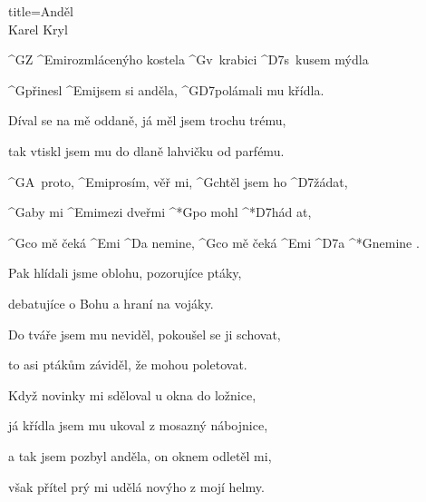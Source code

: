 \begin{song}{title=\predtitle \centering Anděl \\\large Karel Kryl   \vspace*{-0.3cm}}  %
\begin{centerjustified}
\nejnejvetsi
\sloka 
	^{G}Z ^{\z Emi}rozmlácenýho kostela ^{G\z}v~krabici ^{D7\z}s~kusem mýdla

	^{G\z}přinesl ^{Emi}jsem si anděla, ^{G\z D7}polámali mu křídla.

	Díval se na mě oddaně, já měl jsem trochu trému,

	tak vtiskl jsem mu do dlaně lahvičku od parfému.

	^{G\z}A~proto, ^{Emi\z }prosím, věř mi, ^{G\z}chtěl jsem ho ^{D7\z}žádat,
	
	^{G}aby mi ^{Emi\z }mezi dveřmi ^*{G}po mohl ^*{D7}hád at,

	^{G}co mě čeká ^{Emi} ^{D}a nemine, ^{G}co mě čeká ^{Emi} ^{D7}a  ^*{\z G}nemine .

\sloka
	Pak hlídali jsme oblohu, pozorujíce ptáky,
	
	debatujíce o Bohu a hraní na vojáky.

	Do tváře jsem mu neviděl, pokoušel se ji schovat,

	to asi ptákům záviděl, že mohou poletovat.


\sloka
	Když novinky mi sděloval u okna do ložnice,

	já křídla jsem mu ukoval z mosazný nábojnice,
	
	a tak jsem pozbyl anděla, on oknem odletěl mi,

	však přítel prý mi udělá novýho z mojí helmy.


\end{centerjustified}
\setcounter{Slokočet}{0}
\end{song}
